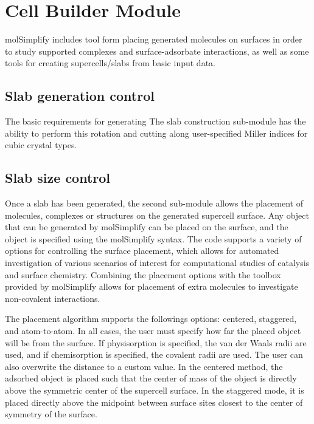 \section{Cell Builder Module}

molSimplify includes tool form placing generated molecules on surfaces in order to study supported complexes and surface-adsorbate interactions, as well as some tools for creating supercells/slabs from basic input data. 

\subsection{Slab generation control}
The basic requirements for generating 
The slab construction sub-module has the ability to perform this rotation and cutting along user-specified Miller indices for cubic crystal types.





\subsection{Slab size control}
Once a slab has been generated, the second sub-module allows the placement of molecules, complexes or  structures on the generated supercell surface. Any object that can be generated by molSimplify can be placed on the surface, and the object is specified using the molSimplify syntax. The code supports a variety of options for controlling the surface placement, which allows for automated investigation of various scenarios of interest for computational studies of catalysis and surface chemistry. Combining the placement options with the toolbox provided by molSimplify allows for placement of extra molecules to investigate non-covalent interactions. 

The placement algorithm supports the followings options: centered, staggered, and atom-to-atom. In all cases, the user must specify how far the placed object will be from the surface. If physisorption is specified, the van der Waals radii are used, and if chemisorption is specified, the covalent radii are used. The user can also overwrite the distance to a custom value.  In the centered method, the adsorbed object is placed such that the center of mass of the object is directly above the symmetric center of the supercell surface.  In the staggered mode, it is placed directly above the midpoint between surface sites closest to the center of symmetry of the surface. 

